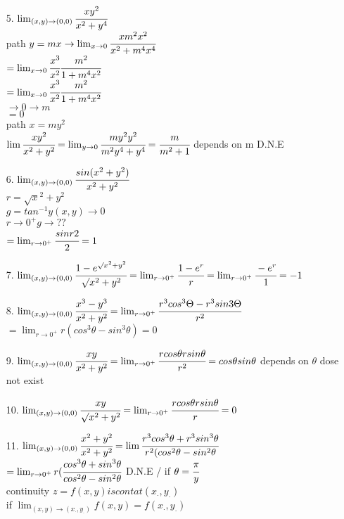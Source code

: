 \begin{enumerate}
    \item[5.] $\lim_{(x,y) \to (0,0)} \cfrac{x y^{2}}{x^{2} + y^{4}}$\\
path $y = mx \rightarrow \lim_{x \to 0} \cfrac{x m^{2} x^{2}}{x^{2} + m^{4} x^{4}}$\\
$= \lim_{x\to 0} \cfrac{x^{3}}{x^{2}} \cfrac{m^{2}}{1+m^{4}x^{2}}$\\
$=\lim_{x\to 0}\cfrac{x^{3}}{x^{2}}\cfrac{m^{2}}{1+m^{4} x^{2}}$\\
              $  \rightarrow 0      \rightarrow m  $\\
              $=0$\\
 path $x = my^{2}$ \\
$\lim \cfrac{xy^{2}}{x^{2} + y^{2}} = \lim_{y \to 0} \cfrac{m y^{2} y^{2}}{m^{2} y^{4} + y^{4}} = \cfrac{m}{m^{2} +1}$ depends on m D.N.E
\item[6.] $\lim_{(x,y)\to(0,0)} \cfrac{sin(x^{2}+ y^{2})}{x^{2}+y^{2}}$\\
$r = \surd x^{2} + y^{2}$\\
$g= tan ^{-1} y      (x,y) \rightarrow 0 $\\
                      $r \rightarrow 0^{+}    g \rightarrow ?? $\\
 $= \lim_{r\to 0^{+}} \cfrac{sin r{2}}{{2}} = 1$
 \item[7.]$\lim_{(x,y) \to (0,0)} \cfrac{1-e^{\surd x^{2} +y^{2}}}{\surd x^{2} + y^{2}} = \lim_{r\to 0^{+}} \cfrac{1-e^{r}}{r} = \lim_{r\to 0^{+}} \cfrac{-e^{r}}{1} = -1 $
 \item[8.]$\lim_{(x,y)\to(0,0)} \cfrac{x^{3}-y^{3}}{x^{2} + y^{2}} = \lim_{r\to 0^{+}} \cfrac{r^{3} cos ^{3}\Theta - r^{3}sin{3}\Theta }{r^{2}}$\\
$=\lim_{r\to 0^{+}} r (cos^{3}\theta - sin^{3} \theta) = 0$
\item[9.]$\lim_{(x,y)\to (0,0)} \cfrac{xy}{x^{2} + y^{2}} = \lim_{r\to 0^{+}} \cfrac{r cos\theta r sin\theta }{r^{2}} = cos\theta sin\theta$ depends on $\theta$ dose not exist
\item[10.]$\lim_{(x,y) \to (0,0)} \cfrac{xy}{\surd x^{2} + y^{2}} = \lim_{r\to 0^{+}} \cfrac{r cos\theta r sin\theta}{r} = 0 $
\item[11.]$\lim_{(x,y) \to (0,0)} \cfrac{x^{2} + y^{2}}{x^{2} + y^{2}} = \lim\cfrac{r^{3} cos^{3}\theta + r^{3} sin^{3}\theta}{r^{2}(cos^{2}\theta-sin^{2}\theta}$\\
$=\lim_{r\to 0^{+}} r (\cfrac{cos^{3}\theta + sin^{3}\theta}{cos^{2}\theta - sin^{2}\theta}$ D.N.E / if $\theta = \cfrac{\pi}{y}$\\
continuity $z=f(x,y) is cont at (x_\cdot , y_\cdot)$ \\
if $\lim_{(x,y) \to (x_\cdot,y_\cdot)} f(x,y) = f(x_\cdot,y_\cdot)$
\end{enumerate}
